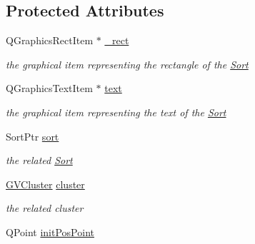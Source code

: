 \subsection*{\-Protected \-Attributes}
\begin{DoxyCompactItemize}
\item 
\hypertarget{class_g_sort_aa5979b4b0c0e9efbccce0de13ded38d8}{\-Q\-Graphics\-Rect\-Item $\ast$ \hyperlink{class_g_sort_aa5979b4b0c0e9efbccce0de13ded38d8}{\-\_\-rect}}\label{class_g_sort_aa5979b4b0c0e9efbccce0de13ded38d8}

\begin{DoxyCompactList}\small\item\em the graphical item representing the rectangle of the \hyperlink{class_sort}{\-Sort} \end{DoxyCompactList}\item 
\hypertarget{class_g_sort_a17c4f8eafc9402f5393e69e614f5429a}{\-Q\-Graphics\-Text\-Item $\ast$ \hyperlink{class_g_sort_a17c4f8eafc9402f5393e69e614f5429a}{text}}\label{class_g_sort_a17c4f8eafc9402f5393e69e614f5429a}

\begin{DoxyCompactList}\small\item\em the graphical item representing the text of the \hyperlink{class_sort}{\-Sort} \end{DoxyCompactList}\item 
\hypertarget{class_g_sort_a8dea499c0b3fa30f9e9558a165a52030}{\-Sort\-Ptr \hyperlink{class_g_sort_a8dea499c0b3fa30f9e9558a165a52030}{sort}}\label{class_g_sort_a8dea499c0b3fa30f9e9558a165a52030}

\begin{DoxyCompactList}\small\item\em the related \hyperlink{class_sort}{\-Sort} \end{DoxyCompactList}\item 
\hypertarget{class_g_sort_aed2a99e461d0af9b2b323e1a9fda92fa}{\hyperlink{struct_g_v_cluster}{\-G\-V\-Cluster} \hyperlink{class_g_sort_aed2a99e461d0af9b2b323e1a9fda92fa}{cluster}}\label{class_g_sort_aed2a99e461d0af9b2b323e1a9fda92fa}

\begin{DoxyCompactList}\small\item\em the related cluster \end{DoxyCompactList}\item 
\hypertarget{class_g_sort_a0985310dc8c415f5ac015cde3a28d6a3}{\-Q\-Point \hyperlink{class_g_sort_a0985310dc8c415f5ac015cde3a28d6a3}{init\-Pos\-Point}}\label{class_g_sort_a0985310dc8c415f5ac015cde3a28d6a3}


\end{DoxyCompactItemize}
